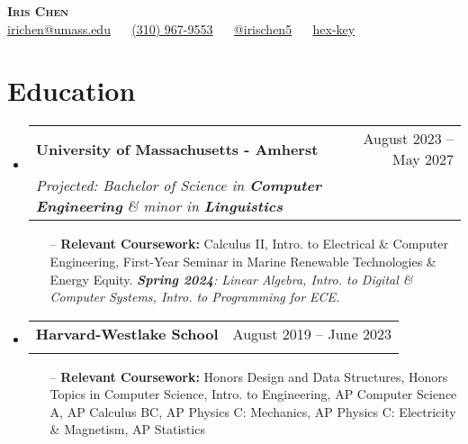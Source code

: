 \documentclass[letterpaper,10pt]{article}
\makeatletter
\newcommand{\resumeSubheading}[4]{
  \vspace{-2pt}\item
    \begin{tabular*}{0.97\textwidth}[t]{l@{\extracolsep{\fill}}r}
      \textbf{#1} & #2 \\
      \textit{\small#3} & \textit{\small #4} \\
    \end{tabular*}\vspace{-7pt}
}
\newcommand{\resumeSubHeadingListStart}{\begin{itemize}[leftmargin=0.15in, label={}]}
\newcommand{\resumeSubHeadingListEnd}{\end{itemize}}
\makeatother
\begin{document}
\begin{center}
    \textbf{\huge \scshape Iris Chen} \\ \vspace{8pt}
    \faEnvelope{} \href{irichen@umass.edu}{irichen@umass.edu} $\quad$ 
    \faPhone{} \href{tel:3109679553}{(310) 967-9553} $\quad$
    \faLinkedin{} \href{https://www.linkedin.com/in/irischen5/}{@irischen5} $\quad$
    \faGithub{} \href{https://github.com/hex-key/}{hex-key} $\quad$
\end{center}


\section{Education}
  \resumeSubHeadingListStart
    \resumeSubheading
      {University of Massachusetts - Amherst}{August 2023 -- May 2027}
      {Projected: Bachelor of Science in \textbf{Computer Engineering} \& minor in \textbf{Linguistics}}{}
        \begin{itemize}\small
        \setlength\itemsep{0em}
            \item[--] \textbf{Relevant Coursework:} Calculus II, Intro. to Electrical \& Computer Engineering, First-Year Seminar in Marine Renewable Technologies \& Energy Equity. \emph{\textbf{Spring 2024}: Linear Algebra, Intro. to Digital \& Computer Systems, Intro. to Programming for ECE.}
        \end{itemize}
    \vspace{-5pt}
    \resumeSubheading
      {Harvard-Westlake School}{August 2019 -- June 2023}
      {}{}
      \vspace{-11pt} 
      \begin{itemize}\small
        \setlength\itemsep{0em}
            \item[--] \textbf{Relevant Coursework:} Honors Design and Data Structures, Honors Topics in Computer Science, Intro. to Engineering, AP Computer Science A, AP Calculus BC, AP Physics C: Mechanics, AP Physics C: Electricity \& Magnetism, AP Statistics
        \end{itemize}
  \resumeSubHeadingListEnd


\end{document}
